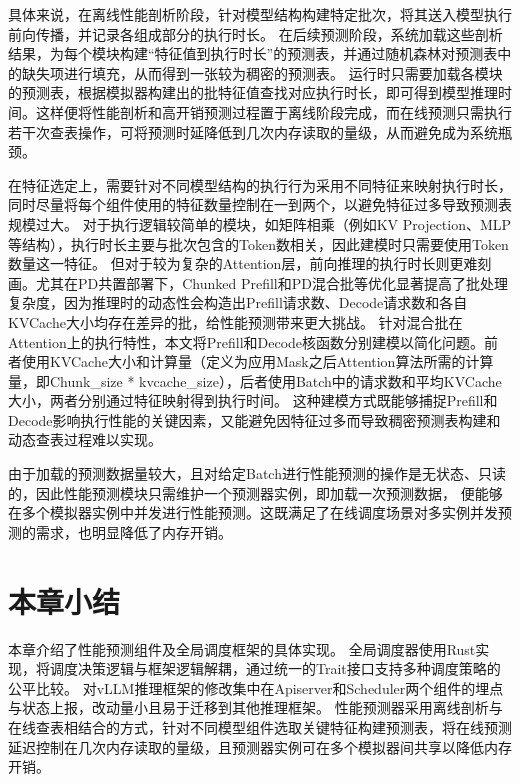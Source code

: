 具体来说，在离线性能剖析阶段，针对模型结构构建特定批次，将其送入模型执行前向传播，并记录各组成部分的执行时长。
在后续预测阶段，系统加载这些剖析结果，为每个模块构建“特征值到执行时长”的预测表，并通过随机森林对预测表中的缺失项进行填充，从而得到一张较为稠密的预测表。
运行时只需要加载各模块的预测表，根据模拟器构建出的批特征值查找对应执行时长，即可得到模型推理时间。这样便将性能剖析和高开销预测过程置于离线阶段完成，而在线预测只需执行若干次查表操作，可将预测时延降低到几次内存读取的量级，从而避免成为系统瓶颈。

在特征选定上，需要针对不同模型结构的执行行为采用不同特征来映射执行时长，同时尽量将每个组件使用的特征数量控制在一到两个，以避免特征过多导致预测表规模过大。
对于执行逻辑较简单的模块，如矩阵相乘（例如KV Projection、MLP等结构），执行时长主要与批次包含的Token数相关，因此建模时只需要使用Token数量这一特征。
但对于较为复杂的Attention层，前向推理的执行时长则更难刻画。尤其在PD共置部署下，Chunked Prefill和PD混合批等优化显著提高了批处理复杂度，因为推理时的动态性会构造出Prefill请求数、Decode请求数和各自KVCache大小均存在差异的批，给性能预测带来更大挑战。
针对混合批在Attention上的执行特性，本文将Prefill和Decode核函数分别建模以简化问题。前者使用KVCache大小和计算量（定义为应用Mask之后Attention算法所需的计算量，即Chunk\_size * kvcache\_size），后者使用Batch中的请求数和平均KVCache大小，两者分别通过特征映射得到执行时间。
这种建模方式既能够捕捉Prefill和Decode影响执行性能的关键因素，又能避免因特征过多而导致稠密预测表构建和动态查表过程难以实现。

由于加载的预测数据量较大，且对给定Batch进行性能预测的操作是无状态、只读的，因此性能预测模块只需维护一个预测器实例，即加载一次预测数据，
便能够在多个模拟器实例中并发进行性能预测。这既满足了在线调度场景对多实例并发预测的需求，也明显降低了内存开销。

\section{本章小结}
本章介绍了性能预测组件及全局调度框架的具体实现。
全局调度器使用Rust实现，将调度决策逻辑与框架逻辑解耦，通过统一的Trait接口支持多种调度策略的公平比较。
对vLLM推理框架的修改集中在Apiserver和Scheduler两个组件的埋点与状态上报，改动量小且易于迁移到其他推理框架。
性能预测器采用离线剖析与在线查表相结合的方式，针对不同模型组件选取关键特征构建预测表，将在线预测延迟控制在几次内存读取的量级，且预测器实例可在多个模拟器间共享以降低内存开销。

